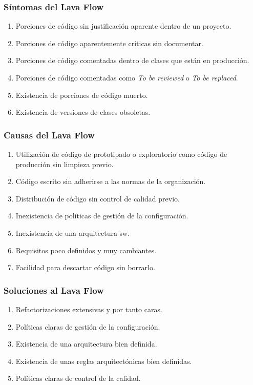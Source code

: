 ﻿\documentclass[animated,a4paper,slidestop,xcolor=pst,blue]{beamer}
\begin{document}
\begin{frame}[c]
    \frametitle{Síntomas del Lava Flow}
    \begin{enumerate}[<+->]
        \item Porciones de código sin justificación aparente dentro de un proyecto.
        \item Porciones de código aparentemente críticas sin documentar.
        \item Porciones de código comentadas dentro de clases que están en producción.
        \item Porciones de código comentadas como \emph{To be reviewed} o \emph{To be replaced}.
        \item Existencia de porciones de código muerto.
        \item Existencia de versiones de clases obsoletas.
    \end{enumerate}
\end{frame}

\begin{frame}[c]
	\frametitle{Causas del Lava Flow}
    \begin{enumerate} [<+->]
        \item Utilización de código de prototipado o exploratorio como código de producción sin limpieza previo.
        \item Código escrito sin adherirse a las normas de la organización.
        \item Distribución de código sin control de calidad previo.
        \item Inexistencia de políticas de gestión de la configuración.
        \item Inexistencia de una arquitectura sw.
        \item Requisitos poco definidos y muy cambiantes.
        \item Facilidad para descartar código sin borrarlo.
    \end{enumerate}
\end{frame}

\begin{frame}[c]
    \frametitle{Soluciones al Lava Flow}
    \begin{enumerate}[<+->]
        \item Refactorizaciones extensivas y por tanto caras.
        \item Políticas claras de gestión de la configuración.
        \item Existencia de una arquitectura bien definida.
        \item Existencia de unas reglas arquitectónicas bien definidas.
        \item Políticas claras de control de la calidad.
    \end{enumerate}
\end{frame}
\end{document}
